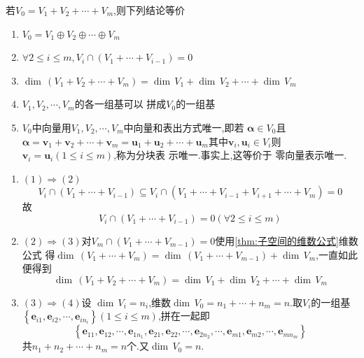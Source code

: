 \begin{formal}
\begin{theorem}[直和的判定]\label{thm:直和的判定}
若$V_0 = V_1 +V_2+\cdots
+V_m$,则下列结论等价
\begin{enumerate}[label=\textup{(\arabic*)}]
    \item $V_0 =V_1\oplus V_2\oplus
    \cdots\oplus V_m$%
    \item $\forall 2\leqslant i\leqslant m,
    V_i \cap \left(V_1 +\cdots
    +V_{i - 1}\right)
    = 0$
    \item $\dim\,\left( V_1 +V_2+\cdots
    +V_m\right)= \dim\, V_1 +\dim\,V_2+\cdots
    +\dim \,V_m$
    \item $V_1,V_2,\cdots,V_m$的各一组基可以
    拼成$V_0$的一组基
    \item $V_0$中向量用$V_1,V_2,\cdots,V_m
    $中向量和表出方式唯一,即若
    $\bm{\alpha}\in V_0 $且$
    \bm{\alpha} =
    \bm{v}_1+\bm{v}_2+\cdots
    +\bm{v}_m = 
    \bm{u}_1 + \bm{u}_2+\cdots
    + \bm{u}_m
    $其中$\bm{v}_i,\bm{u}_i
    \in V_i$则$\bm{v}_i = \bm{u}_i
    \left(
        1\leqslant i\leqslant m
    \right)$,称为分块表
    示唯一.事实上,这等价于
    零向量表示唯一.
\end{enumerate}
\end{theorem}
\begin{Proof}
\begin{enumerate}[label=\textup{(\Roman*)}]
\item $(1)\Longrightarrow (2)$
\[
V_i\cap \left(V_1+\cdots+V_{i-1}\right)\subseteq
V_i\cap \left(V_1+\cdots+V_{i-1}+V_{i+1}+\cdots+
V_m\right)=0
\]
故
\[
V_i \cap \left(V_1 +\cdots
    +V_{i - 1}\right)
    = 0\left(\forall 2\leqslant i\leqslant 
    m\right)
\]

\item $(2)\Longrightarrow (3)$对$V_m\cap\left(V_1+\cdots+V_{m-1}\right)=0$使用\cref{thm:子空间的维数公式}维数公式
得$\dim\,\left(V_1+\cdots+V_m\right)=\dim\,\left(V_1+\cdots+V_{m-1}\right)+\dim\,V_m$,一直如此便得到
\[
\dim\,\left( V_1 +V_2+\cdots
    +V_m\right)= \dim\, V_1 +\dim\,V_2+\cdots
    +\dim \,V_m
\]

\item $(3)\Longrightarrow(4)$设
$\dim\,V_i=n_i$,维数$\dim\,V_0=n_1+\cdots+n_m
=n$.取$V_i$的一组基
$\left\{\bm{e}_{i1},\bm{e}_{i2},\cdots,
\bm{e}_{in_i}\right\}\left(1\leqslant i \leqslant 
m\right)$,拼在一起即
\[
\left\{
    \bm{e}_{11},\bm{e}_{12},\cdots,\bm{e}_{1n_1},
    \bm{e}_{21},\bm{e}_{22},\cdots,\bm{e}_{2n_2},
    \cdots,
    \bm{e}_{m1},\bm{e}_{m2},\cdots,\bm{e}_{mn_m}
\right\}
\]
共$n_1+n_2+\cdots+n_m=n$个.又$\dim\,V_0=n.$


\end{enumerate}
\end{Proof}
\end{formal}
